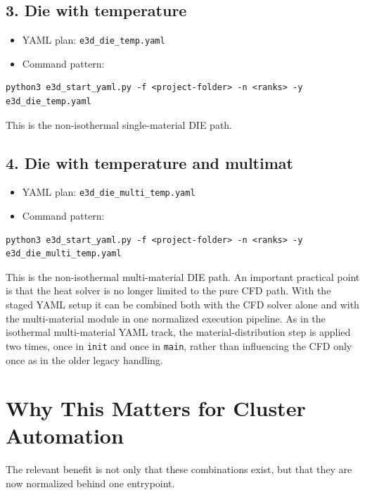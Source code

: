 \documentclass[11pt,a4paper]{article}
\begin{document}
\subsection*{3. Die with temperature}

\begin{itemize}[leftmargin=*]
  \item YAML plan: \texttt{e3d\_die\_temp.yaml}
  \item Command pattern:
\end{itemize}

\begin{verbatim}
python3 e3d_start_yaml.py -f <project-folder> -n <ranks> -y e3d_die_temp.yaml
\end{verbatim}

This is the non-isothermal single-material DIE path.

\subsection*{4. Die with temperature and multimat}

\begin{itemize}[leftmargin=*]
  \item YAML plan: \texttt{e3d\_die\_multi\_temp.yaml}
  \item Command pattern:
\end{itemize}

\begin{verbatim}
python3 e3d_start_yaml.py -f <project-folder> -n <ranks> -y e3d_die_multi_temp.yaml
\end{verbatim}

This is the non-isothermal multi-material DIE path. An important practical point is that the heat solver is no
longer limited to the pure CFD path. With the staged YAML setup it can be combined both with the CFD solver alone
and with the multi-material module in one normalized execution pipeline. As in the isothermal multi-material YAML
track, the material-distribution step is applied two times, once in \texttt{init} and once in \texttt{main},
rather than influencing the CFD only once as in the older legacy handling.

\section*{Why This Matters for Cluster Automation}

The relevant benefit is not only that these combinations exist, but that they are now normalized behind one
entrypoint.
\end{document}
